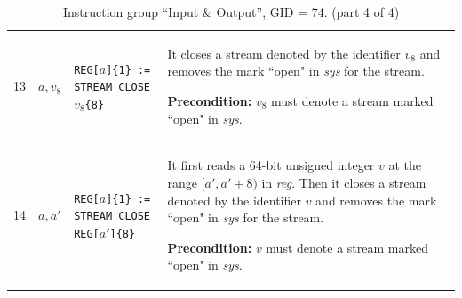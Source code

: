 \documentclass[10pt,twocolumn]{article}
\begin{document}
\begin{table}[!h]
\begin{center}
\begin{tabular}{lp{1.2cm}p{5.5cm}p{7.5cm}}
13 & $ a,v_8 $ %
& \texttt{REG[}$ a $\texttt{]\{1\} := STREAM CLOSE }$ v_8 $\texttt{\{8\}} %
& It closes a stream denoted by the identifier $ v_8 $ and removes the mark
``open" in \textit{sys} for the stream.

\textbf{Precondition:} $ v_8 $ must denote a stream marked ``open" in
\textit{sys}. \\

14 & $ a,a' $ %
& \texttt{REG[}$ a $\texttt{]\{1\} := STREAM CLOSE REG[}$ a' $\texttt{]\{8\}} %
& It first reads a 64-bit unsigned integer $ v $ at the range $ [a',a'+8) $ in
\textit{reg}. Then it closes a stream denoted by the identifier $ v $ and
removes the mark ``open" in \textit{sys} for the stream.

\textbf{Precondition:} $ v $ must denote a stream marked ``open" in
\textit{sys}. \\

%
%


\end{tabular}
\end{center}
\caption{Instruction group ``Input \& Output'', GID = 74. (part 4 of 4)}
\end{table}



\end{document}
